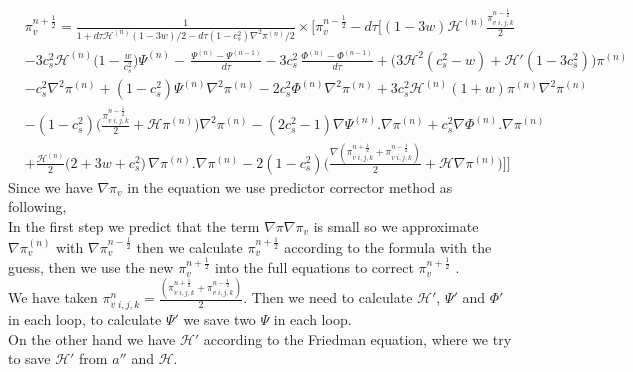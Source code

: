 \documentclass[a4paper,11pt]{article}
\begin{document}
\begin{align} 
%
 &\pi_v ^{n+\frac{1}{2}}= \frac{1}{1+ d\tau   \mathcal{H}^{(n)}  (1-3w) /2 - d\tau (1-c_s^2) \nabla^2 \pi^{(n)}/2} \times \Bigg[ \pi_v ^{n-\frac{1}{2}} - d \tau \Big [(1- 3w)\mathcal{H}^{(n)}   \frac{\pi_{v \; {i,j,k}}^{n-\frac{1}{2}} }{2}
     \nonumber
     \\
      &
  -3 { c_s^2 \mathcal{H}^{(n)}}\Big( 1- \frac{w}{c_s^2} \Big )\Psi^{(n) }
 - \, \frac{{\Psi}^{(n)}-{\Psi}^{(n-1)} }{d \tau}
      - 3  c_s^2  \, \frac{{\Phi}^{(n)}-{\Phi}^{(n-1)} }{d \tau}    
   +\Big( 3\mathcal{H}^2 (c_s^2 -w) + \mathcal{H}' (1-3c_s^2) \Big)\pi^{(n)}  
             \nonumber
     \\
      &
       - c_s^2 {\nabla^2 \pi ^{(n)}}  
   + (1-c_s^2)\Psi^{(n)} {\nabla^{2} \pi^{(n)}  }    
    - 2 c_s^2  \Phi ^{(n)}  {\nabla^2 \pi^{(n)}}
     + {3 c_s^2  \mathcal{H}^{(n)} (1+w) }\pi^{(n)} {\nabla^2 \pi^{(n)} }   
          \nonumber
     \\
      &
     -  (1-c_s^2)
 \Big( \frac{\pi_{v \; {i,j,k}}^{n-\frac{1}{2}} }{2} +\mathcal{H}  \pi^{(n)}  \Big) {\nabla^2  \pi^{(n)}} 
    - (2 c_s^2-1) {\nabla  \Psi^{(n)}  . \nabla \pi ^{(n)} }
    + c_s^2 {\nabla  \Phi ^{(n)} . \nabla \pi^{(n)}  }  
                              \nonumber
     \\
       & 
              +\frac{\mathcal{H}^{(n)}} {2 } \Big(2+3w+c_s^2  \Big) \,{\nabla  \pi^{(n)} . \nabla \pi^{(n)} }  
         -2(1-c_s^2) \Big( \frac{{ \nabla  ( \pi_{v  \; {i,j,k}}^{n+\frac{1}{2}} +\pi_{v \; {i,j,k}}^{n-\frac{1}{2}} ) }  } {2}  + \mathcal{H}  \nabla\pi^{(n)} \Big) 
    \Big] \Bigg]
\end{align}
Since we have $\nabla \pi_v $ in the equation we use predictor corrector method as following,\\
In the first step we predict that the term $\nabla \pi \nabla \pi_v$ is small so we approximate $\nabla \pi_v ^{(n)}$ with $\nabla \pi_v^{n-\frac{1}{2}}$ then we calculate $\pi_v^{n+\frac{1}{2}}$ according to the formula with the guess, then we use the new $\pi_v^{n+\frac{1}{2}}$ into the full equations to correct $\pi_v^{n+\frac{1}{2}}$ . \\
 We have taken $\pi_{v  \; {i,j,k}}^{n} =\frac{(\pi_{v  \; {i,j,k}}^{n+\frac{1}{2}} +\pi_{v \; {i,j,k}}^{n-\frac{1}{2}} )}{2} $. Then we need to calculate $\mathcal{H}'$, ${\Psi}'$ and  ${\Phi}'$ in each loop, to calculate ${\Psi}'$ we save two $\Psi$ in each loop. \\
 On the other hand we have $\mathcal{H}'$ according to the Friedman equation, where we try to save $\mathcal{H}'$ from $a''$  and $\mathcal{H}$.
\end{document}
